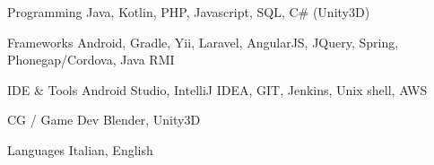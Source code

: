 


\begin{cvskills}


\cvskill
{Programming} %
{Java, Kotlin, PHP, Javascript, SQL, C\# (Unity3D)} %


\cvskill
{Frameworks} %
{Android, Gradle, Yii, Laravel, AngularJS, JQuery, Spring, Phonegap/Cordova, Java RMI} %


\cvskill
{IDE \& Tools} %
{Android Studio, IntelliJ IDEA, GIT, Jenkins, Unix shell, AWS} %


\cvskill
{CG / Game Dev} %
{Blender, Unity3D} %


\cvskill
{Languages} %
{Italian, English} %


\end{cvskills}
